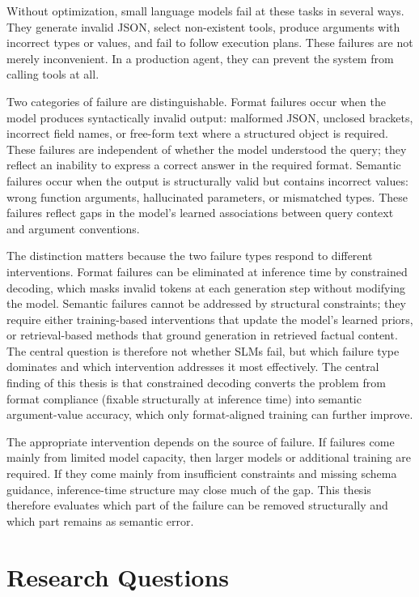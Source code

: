 Without optimization, small language models fail at these tasks in several ways. They generate invalid JSON, select non-existent tools, produce arguments with incorrect types or values, and fail to follow execution plans. These failures are not merely inconvenient. In a production agent, they can prevent the system from calling tools at all.

Two categories of failure are distinguishable. Format failures occur
when the model produces syntactically invalid output: malformed JSON,
unclosed brackets, incorrect field names, or free-form text where a
structured object is required. These failures are independent of
whether the model understood the query; they reflect an inability to
express a correct answer in the required format. Semantic failures
occur when the output is structurally valid but contains incorrect
values: wrong function arguments, hallucinated parameters, or
mismatched types. These failures reflect gaps in the model's learned
associations between query context and argument conventions.

The distinction matters because the two failure types respond to
different interventions. Format failures can be eliminated at
inference time by constrained decoding, which masks invalid tokens at
each generation step without modifying the model. Semantic failures
cannot be addressed by structural constraints; they require either
training-based interventions that update the model's learned priors,
or retrieval-based methods that ground generation in retrieved
factual content. The central question is therefore not whether SLMs
fail, but which failure type dominates and which intervention
addresses it most effectively. The central finding of this thesis is
that constrained decoding converts the problem from format compliance
(fixable structurally at inference time) into semantic
argument-value accuracy, which only format-aligned training can
further improve.

The appropriate intervention depends on the source of failure. If failures come
mainly from limited model capacity, then larger models or additional training
are required. If they come mainly from insufficient constraints and missing
schema guidance, inference-time structure may close much of the gap. This thesis
therefore evaluates which part of the failure can be removed structurally and
which part remains as semantic error.

\section{Research Questions}

